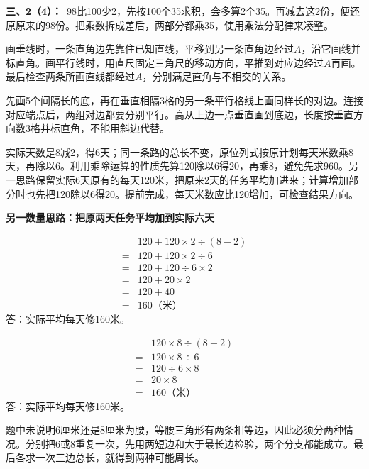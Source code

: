 \documentclass[multi=snippet,border=0pt]{standalone}
\newenvironment{snippet}[3]{\begin{minipage}{#1bp}\color{answerred}\fontsize{#2}{#3}\selectfont\raggedright}{\end{minipage}}
\begin{document}
\begin{snippet}{505}{11.5}{14}\textbf{三、2（4）：}\ 98比100少2，先按100个35求积，会多算2个35。再减去这2份，便还原原来的98份。把乘数拆成差后，两部分都乘35，使用乘法分配律来凑整。\end{snippet}
\begin{snippet}{505}{11.5}{14}画垂线时，一条直角边先靠住已知直线，平移到另一条直角边经过\(A\)，沿它画线并标直角。画平行线时，用直尺固定三角尺的移动方向，平推到对应边经过\(A\)再画。最后检查两条所画直线都经过\(A\)，分别满足直角与不相交的关系。\end{snippet}
\begin{snippet}{505}{11.5}{14}先画5个间隔长的底，再在垂直相隔3格的另一条平行格线上画同样长的对边。连接对应端点后，两组对边都要分别平行。高从上边一点垂直画到底边，长度按垂直方向数3格并标直角，不能用斜边代替。\end{snippet}
\begin{snippet}{505}{11.5}{14}实际天数是8减2，得6天；同一条路的总长不变，原位列式按原计划每天米数乘8天，再除以6。利用乘除运算的性质先算120除以6得20，再乘8，避免先求960。另一思路保留实际6天原有的每天120米，把原来2天的任务平均加进来；计算增加部分时也先把120除以6得20。提前完成，每天米数应比120增加，可检查结果方向。\par \textbf{另一数量思路：把原两天任务平均加到实际六天}\par \[\begin{aligned}&120+120\times2\div(8-2)\\={}&120+120\times2\div6\\={}&120+120\div6\times2\\={}&120+20\times2\\={}&120+40\\={}&160\text{（米）}\end{aligned}\]答：实际平均每天修160米。\end{snippet}
\begin{snippet}{268}{10.5}{12.8}\[\begin{aligned}&120\times8\div(8-2)\\={}&120\times8\div6\\={}&120\div6\times8\\={}&20\times8\\={}&160\text{（米）}\end{aligned}\]答：实际平均每天修160米。\end{snippet}
\begin{snippet}{505}{11.5}{14}题中未说明6厘米还是8厘米为腰，等腰三角形有两条相等边，因此必须分两种情况。分别把6或8重复一次，先用两短边和大于最长边检验，两个分支都能成立。最后各求一次三边总长，就得到两种可能周长。\end{snippet}
\end{document}
